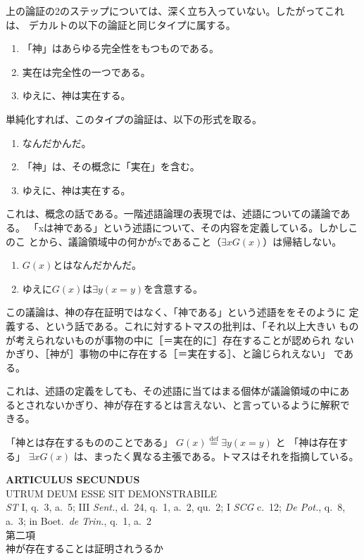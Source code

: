 \documentclass[paper=a4paper,fontsize=10pt,jafontsize=9pt,titlepage]{jlreq}
\begin{document}
上の論証の2のステップについては、深く立ち入っていない。したがってこれは、
デカルトの以下の論証と同じタイプに属する。

\begin{enumerate}
 \item 「神」はあらゆる完全性をもつものである。
 \item 実在は完全性の一つである。
 \item ゆえに、神は実在する。
\end{enumerate}

単純化すれば、このタイプの論証は、以下の形式を取る。

\begin{enumerate}
 \item なんだかんだ。
 \item 「神」は、その概念に「実在」を含む。
 \item ゆえに、神は実在する。
\end{enumerate}
\noindent
これは、概念の話である。一階述語論理の表現では、述語についての議論である。
「xは神である」という述語について、その内容を定義している。しかしこのこ
とから、議論領域中の何かがxであること（$\exists xG(x)$）は帰結しない。

\begin{enumerate}
 \item $G(x)$とはなんだかんだ。
 \item ゆえに$G(x)$は$\exists y(x=y)$を含意する。
\end{enumerate}

この議論は、神の存在証明ではなく、「神である」という述語ををそのように
定義する、という話である。これに対するトマスの批判は、「それ以上大きい
ものが考えられないものが事物の中に［＝実在的に］存在することが認められ
ないかぎり、［神が］事物の中に存在する［＝実在する］、と論じられえない」
である。

これは、述語の定義をしても、その述語に当てはまる個体が議論領域の中にあ
るとされないかぎり、神が存在するとは言えない、と言っているように解釈で
きる。

「神とは存在するもののことである」
$G(x) \overset{\mathrm{def}}{=} \exists y(x=y)$
と
「神は存在する」
$\exists xG(x)$
は、まったく異なる主張である。トマスはそれを指摘している。
 

\newpage
{}
{}
\setcounter{section}{2}
\setcounter{subsection}{0}
\begin{center}
 {\Large {\bfseries ARTICULUS SECUNDUS}}\\
 {\large UTRUM DEUM ESSE SIT DEMONSTRABILE}\\
 {\footnotesize {\itshape ST} I, q.~3, a.~5; III {\itshape Sent.}, d.~24, q.~1,
 a.~2, qu.~2; I {\itshape SCG} c.~12; {\itshape De Pot.}, q.~8, a.~3; in
 Boet.~{\itshape de Trin.}, q.~1, a.~2}\\
 {\Large 第二項\\神が存在することは証明されうるか}
\end{center}
\end{document}
